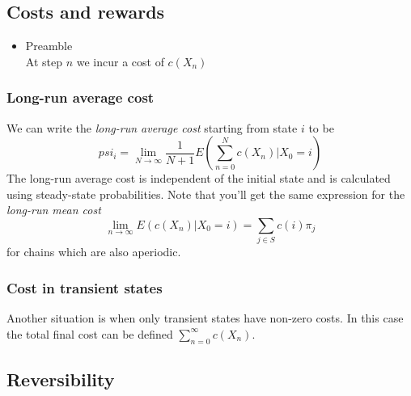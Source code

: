 \documentclass[11pt,a4paper]{article}
\begin{document}
\subsection{Costs and rewards}

\begin{itemize}

    \item Preamble \\
        At step $n$ we incur a cost of $c(X_n)$

\end{itemize}

\subsubsection{Long-run average cost}

We can write the \emph{long-run average cost} starting from state $i$ to be
\[
    psi_i = \lim_{N \to \infty} \frac{1}{N+1} E\left( \sum_{n=0}^N c(X_n) | X_0 = i \right)
\]
The long-run average cost is independent of the initial state and is calculated using steady-state probabilities.
Note that you'll get the same expression for the \emph{long-run mean cost}
\[
    \lim_{n \to \infty} E(c(X_n)|X_0=i) = \sum_{j \in S}c(i)\pi_j
\]
for chains which are also aperiodic.

\subsubsection{Cost in transient states}
Another situation is when only transient states have non-zero costs.
In this case the total final cost can be defined $\sum_{n=0}^\infty c(X_n)$.

\subsection{Reversibility}
\end{document}
